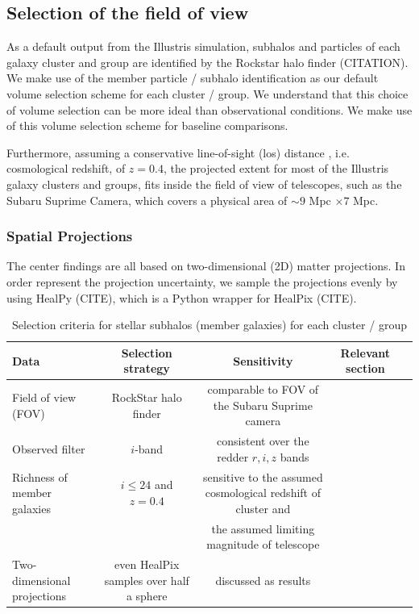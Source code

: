 \documentclass[usenatbib]{mn2e}
\begin{document}
\subsection{Selection of the field of view}
\label{sec:FOV}
As a default output from the Illustris simulation, subhalos and particles of
each galaxy cluster and group are identified by the Rockstar halo finder
(CITATION). We make use of the member particle / subhalo identification as our
default volume selection scheme for each cluster / group.
We understand that this choice of volume selection can be more ideal than
observational conditions. We make use of this volume selection scheme
for baseline comparisons. 

Furthermore, assuming a conservative line-of-sight (los) distance 
, i.e. cosmological redshift, of $z = 0.4$, 
the projected extent for most of the Illustris galaxy clusters and groups, 
fits inside the field of view of telescopes, such as the Subaru Suprime Camera,
which covers a physical area of $\sim 9$ Mpc $\times 7$ Mpc. 

\subsubsection{Spatial Projections}
The center findings are all based on two-dimensional (2D) matter projections.
In order represent the projection uncertainty, we sample the projections evenly
by using HealPy (CITE), which is a Python wrapper for HealPix (CITE).


\begin{table}
\begin{center}
\begin{minipage}{180mm} 
	\caption{ Selection criteria for stellar subhalos (member galaxies) for each
		cluster / group 
\label{tab:member_galaxy_selections}} 
	\begin{tabular}{@{}lcccc@{}}
\hline 
Data &  Selection strategy  & Sensitivity & Relevant section  \\ \hline
Field of view (FOV) & RockStar halo finder& comparable to FOV of the Subaru
Suprime camera &   \\ 
Observed filter & $i$-band & consistent over the redder $r, i, z$ bands &   \\ 
Richness of member galaxies & $i \leq 24$ and $z = 0.4$  & sensitive to
the assumed cosmological redshift of cluster and &    \\ 
& & the assumed limiting magnitude of telescope &   \\
Two-dimensional projections & even HealPix samples over half a sphere &
discussed as results  & \\  
\hline
\end{tabular} 
\label{tab:selection_criteria} 
\footnotesize{
}
\end{minipage}
\end{center} 
\end{table}
\end{document}
